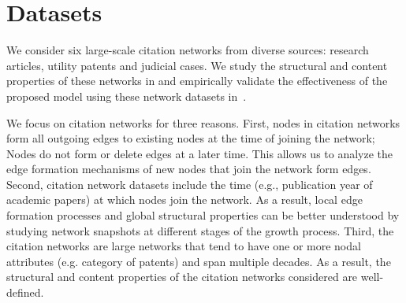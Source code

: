 
\section{Datasets}
\label{sec:Datasets}

We consider six large-scale citation networks from diverse sources: research articles,
utility patents and judicial cases.
We study the structural
and content properties of these networks in  and empirically
validate the effectiveness of the proposed model using these network datasets in~.

We focus on citation networks for three reasons. First, nodes in citation networks
form all outgoing edges to existing nodes at the time of joining the network; Nodes do
not form or delete edges at a later time. This allows us to analyze
the edge formation mechanisms of new nodes that join the network form edges.
Second, citation network datasets include the time (e.g., publication year of academic
papers) at which nodes join the network. As a result, local edge formation
processes and global structural properties can be better understood by studying
network snapshots at different stages of the growth process. Third, the citation
networks are large networks that tend to have one or more nodal attributes (e.g. category of patents)
and span multiple decades. As a result, the structural and content properties of the citation
networks considered are well-defined.

